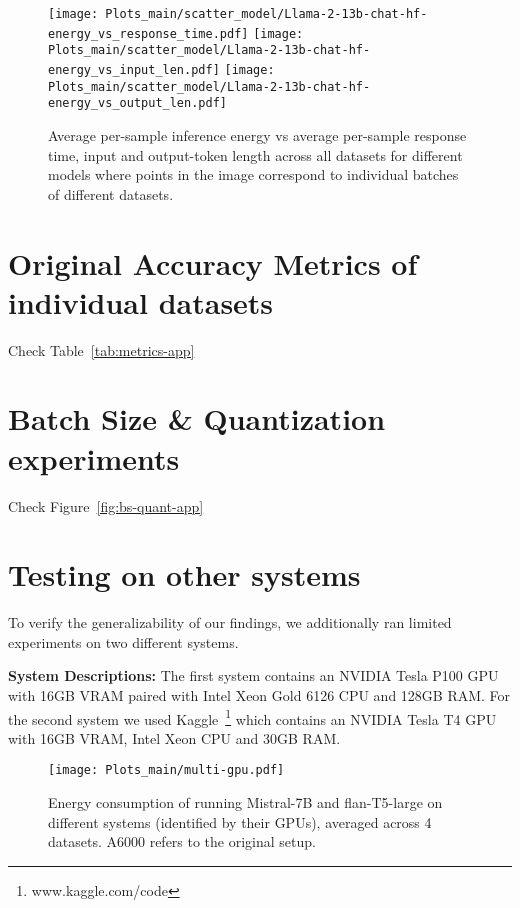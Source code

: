 \begin{figure*}[!ht]
    {\texttt{[image: Plots\_main/scatter\_model/Llama-2-13b-chat-hf-energy\_vs\_response\_time.pdf]}}
    {\texttt{[image: Plots\_main/scatter\_model/Llama-2-13b-chat-hf-energy\_vs\_input\_len.pdf]}}
    {\texttt{[image: Plots\_main/scatter\_model/Llama-2-13b-chat-hf-energy\_vs\_output\_len.pdf]}}

    
    
    \caption{Average per-sample inference energy vs average per-sample response time, input and output-token length across all datasets for different models where points in the image correspond to individual batches of different datasets.}
    \label{fig:scatter-app}
\end{figure*}


\section{Original Accuracy Metrics of individual datasets}
\label{app:scores}
Check Table~\ref{tab:metrics-app}




\section{Batch Size \& Quantization experiments}
\label{app:bs_quant}
Check Figure~\ref{fig:bs-quant-app}



\section{Testing on other systems}
\label{app:mgpu}

To verify the generalizability of our findings, we additionally ran limited experiments on two different systems. 

\noindent \textbf{System Descriptions:}
The first system contains an NVIDIA Tesla P100 GPU with 16GB VRAM paired with Intel Xeon Gold 6126 CPU and 128GB RAM. For the second system we used Kaggle~\footnote{www.kaggle.com/code} which contains an NVIDIA Tesla T4 GPU with 16GB VRAM, Intel Xeon CPU and 30GB RAM.


\begin{figure*}
    \centering
    \texttt{[image: Plots\_main/multi-gpu.pdf]}
    \caption{Energy consumption of running Mistral-7B and flan-T5-large on different systems (identified by their GPUs), averaged across 4 datasets. A6000 refers to the original setup.}
    \label{fig:mgpu}
\end{figure*}



